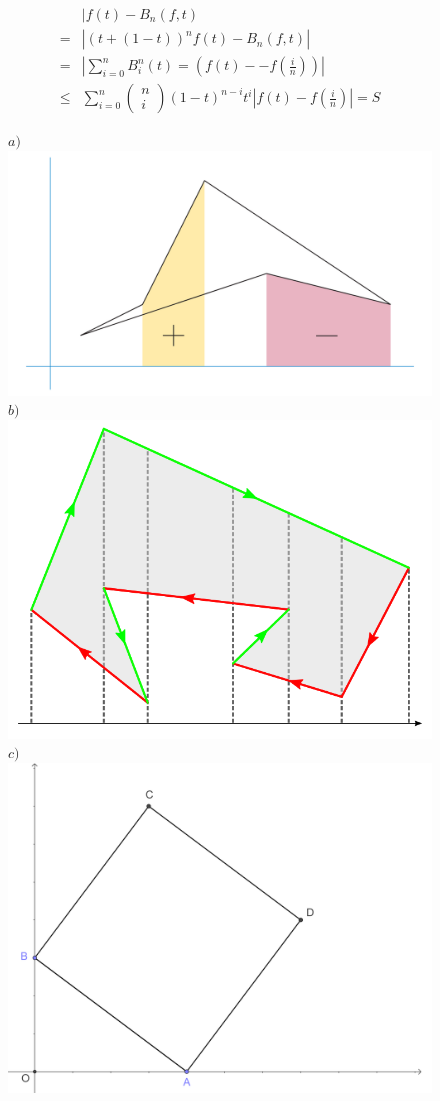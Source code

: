 \begin{multicols}{2}
		\begin{align*}
			&|f(t) - B_n(f,t) \\
			= &|\left(t + (1-t)\right)^nf(t) - B_n(f,t)|\\
			=&\left| {\sum\limits_{i = 0}^n {B_i^n(t)}  = \left( {f(t) -  - f\left( {\frac{i}{n}} \right)} \right)} \right|\\
			\le &\sum\limits_{i = 0}^n {\left( \begin{array}{l}
					n\\
					i
				\end{array} \right){{(1 - t)}^{n - i}}{t^i}} \left| {f(t) - f\left( {\frac{i}{n}} \right)} \right| = S
		\end{align*}
		\begin{figure}[H]
			\vspace*{-5pt}
			\centering
			\captionsetup{labelformat= empty, justification=centering}
			$a)$\includegraphics[width= 0.77\linewidth]{17}
			$b)$\includegraphics[width= 0.77\linewidth]{18}
			\hspace*{15pt}$c)$\includegraphics[width= 0.89\linewidth]{19}

\end{figure}
\end{multicols}
